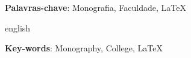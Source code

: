 
\setlength{\absparsep}{18pt} %
\begin{resumo}


	\lipsum[1-2]
	
	 \textbf{Palavras-chave}: Monografia, Faculdade, \LaTeX

\end{resumo}

\begin{resumo}[Abstract]
	\begin{otherlanguage*}{english}

		\lipsum[1-2]
		
		\vspace{\onelineskip}
 
	   \noindent 
	   \textbf{Key-words}:  Monography, College, \LaTeX
	\end{otherlanguage*}
\end{resumo}